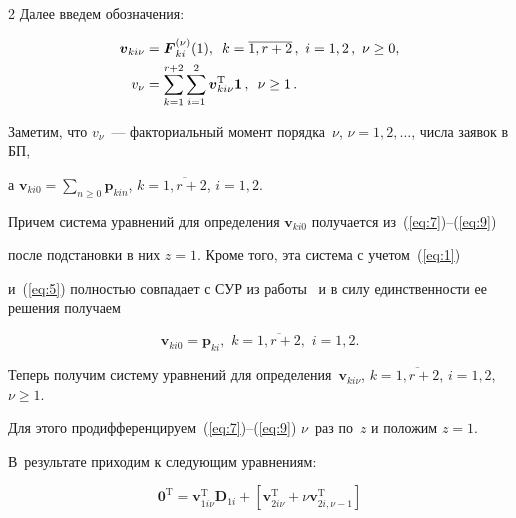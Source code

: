 \begin{multicols}{2}
Далее введем обозначения:

\begin{align}

\label{eq:10}

 \boldsymbol{v}_{ki\nu}&=\boldsymbol{F}_{ki}^{(\nu)}(1),\,\ 

k=\overline{1,r+2}\,, \ i=1,2\,,\ \nu\geq 0,\\

v_{\nu}&=\sum\limits_{k=1}^{r+2}\sum\limits_{i=1}^2 \boldsymbol{v}_{ki\nu}^{\mathrm{T}} \boldsymbol{1}\,, \enskip \nu\geq 1\,.

\label{dd}

\end{align}



Заметим, что $v_{\nu}$~--- факториальный момент  порядка~$\nu$, $\nu=1,2,\ldots$, числа заявок в БП, 

а $\boldsymbol{v}_{ki0}=\sum\limits_{n\geq 0}\boldsymbol{p}_{kin}$, $k=\overline{1,r+2}$, $i=1,2$. 

Причем система уравнений для определения $\boldsymbol{v}_{ki0}$ получается из~(\ref{eq:7})--(\ref{eq:9}) 

после подстановки в них $z=1$. Кроме того, эта система с учетом~(\ref{eq:1})

 и~(\ref{eq:5}) полностью совпадает с СУР из работы~\cite{2mat} и в силу единственности ее решения получаем

\begin{equation*}


\boldsymbol{v}_{ki0}=\boldsymbol{p}_{ki},\,\, k=\overline{1,r+2}, \,\, i=1,2.

\end{equation*}





Теперь получим систему уравнений для определения~$\boldsymbol{v}_{ki\nu}$, $k=\overline{1,r+2}$, $i=1,2$, $\nu\geq 1$. 

Для этого продифференцируем~(\ref{eq:7})--(\ref{eq:9}) $\nu$~раз по~$z$ и положим $z=1$. 

В~результате приходим к следующим уравнениям:

\begin{equation}

\!\!\boldsymbol{0}^{\mathrm{T}}=\boldsymbol{v}_{1i\nu}^{\mathrm{T}}\boldsymbol{D}_{1i}+

\left[\boldsymbol{v}_{2i\nu}^{\mathrm{T}}+\nu\boldsymbol{v}_{2i,\nu-1}^{\mathrm{T}}\right]


\end{equation}
\end{multicols}

